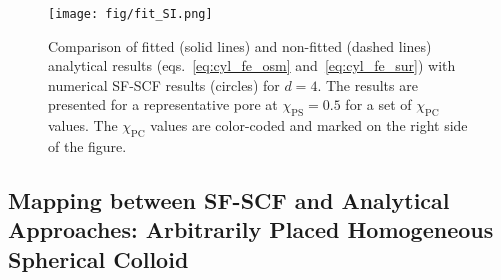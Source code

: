 \documentclass[10pt, a4paper]{article}
\begin{document}
\begin{multicols}{2}
\begin{figure}[H]
    \centering
    \texttt{[image: fig/fit\_SI.png]}
    \caption{
    Comparison of fitted (solid lines) and non-fitted (dashed lines) analytical results (eqs.~\ref{eq:cyl_fe_osm} and~\ref{eq:cyl_fe_sur}) with numerical SF-SCF results (circles) for $d = 4$.
    The results are presented for a representative pore at $\chi_{\textrm{PS}} = 0.5$ for a set of $\chi_{\textrm{PC}}$ values.
    The $\chi_{\textrm{PC}}$ values are color-coded and marked on the right side of the figure.
    }
    \label{fig:fit_SI}
\end{figure}

\end{multicols}



\subsection*{Mapping between SF-SCF and Analytical Approaches: Arbitrarily Placed Homogeneous Spherical Colloid}
\end{document}
